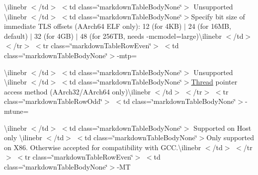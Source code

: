 \begin{longtabu}
{\ttfamily \textbackslash{}ilinebr \texorpdfstring{$<$}{<}/td\texorpdfstring{$>$}{>} \texorpdfstring{$<$}{<}td class=\char`\"{}markdown\+Table\+Body\+None\char`\"{}\texorpdfstring{$>$}{>} Unsupported \textbackslash{}ilinebr \texorpdfstring{$<$}{<}/td\texorpdfstring{$>$}{>} \texorpdfstring{$<$}{<}td class=\char`\"{}markdown\+Table\+Body\+None\char`\"{}\texorpdfstring{$>$}{>}}Specify bit size of immediate TLS offsets (AArch64 ELF only)\+: 12 (for 4KB) $|$ 24 (for 16MB, default) $|$ 32 (for 4GB) $|$ 48 (for 256TB, needs -\/mcmodel=large){\ttfamily \textbackslash{}ilinebr \texorpdfstring{$<$}{<}/td\texorpdfstring{$>$}{>} \texorpdfstring{$<$}{<}/tr\texorpdfstring{$>$}{>} \texorpdfstring{$<$}{<}tr class=\char`\"{}markdown\+Table\+Row\+Even\char`\"{}\texorpdfstring{$>$}{>} \texorpdfstring{$<$}{<}td class=\char`\"{}markdown\+Table\+Body\+None\char`\"{}\texorpdfstring{$>$}{>}}-\/mtp=

{\ttfamily \textbackslash{}ilinebr \texorpdfstring{$<$}{<}/td\texorpdfstring{$>$}{>} \texorpdfstring{$<$}{<}td class=\char`\"{}markdown\+Table\+Body\+None\char`\"{}\texorpdfstring{$>$}{>} Unsupported \textbackslash{}ilinebr \texorpdfstring{$<$}{<}/td\texorpdfstring{$>$}{>} \texorpdfstring{$<$}{<}td class=\char`\"{}markdown\+Table\+Body\+None\char`\"{}\texorpdfstring{$>$}{>}}\mbox{\hyperlink{class_thread}{Thread}} pointer access method (AArch32/\+AArch64 only){\ttfamily \textbackslash{}ilinebr \texorpdfstring{$<$}{<}/td\texorpdfstring{$>$}{>} \texorpdfstring{$<$}{<}/tr\texorpdfstring{$>$}{>} \texorpdfstring{$<$}{<}tr class=\char`\"{}markdown\+Table\+Row\+Odd\char`\"{}\texorpdfstring{$>$}{>} \texorpdfstring{$<$}{<}td class=\char`\"{}markdown\+Table\+Body\+None\char`\"{}\texorpdfstring{$>$}{>}}-\/mtune=

{\ttfamily \textbackslash{}ilinebr \texorpdfstring{$<$}{<}/td\texorpdfstring{$>$}{>} \texorpdfstring{$<$}{<}td class=\char`\"{}markdown\+Table\+Body\+None\char`\"{}\texorpdfstring{$>$}{>} Supported on Host only \textbackslash{}ilinebr \texorpdfstring{$<$}{<}/td\texorpdfstring{$>$}{>} \texorpdfstring{$<$}{<}td class=\char`\"{}markdown\+Table\+Body\+None\char`\"{}\texorpdfstring{$>$}{>}}Only supported on X86. Otherwise accepted for compatibility with GCC.{\ttfamily \textbackslash{}ilinebr \texorpdfstring{$<$}{<}/td\texorpdfstring{$>$}{>} \texorpdfstring{$<$}{<}/tr\texorpdfstring{$>$}{>} \texorpdfstring{$<$}{<}tr class=\char`\"{}markdown\+Table\+Row\+Even\char`\"{}\texorpdfstring{$>$}{>} \texorpdfstring{$<$}{<}td class=\char`\"{}markdown\+Table\+Body\+None\char`\"{}\texorpdfstring{$>$}{>}}-\/MT 


\end{longtabu}
